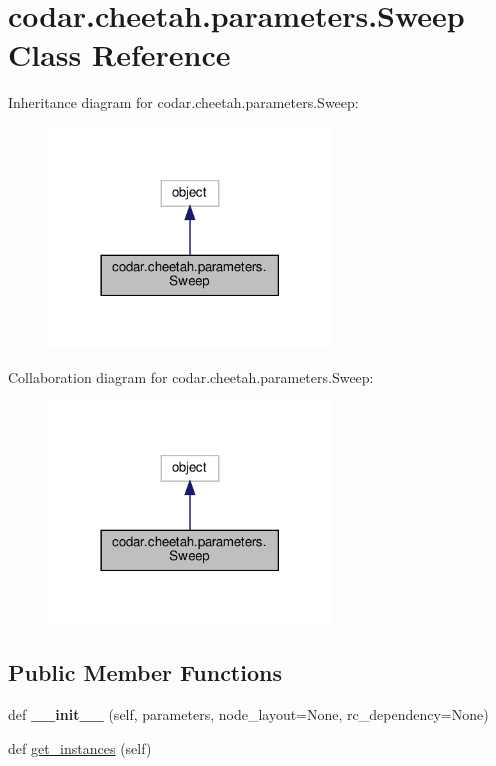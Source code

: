 \hypertarget{classcodar_1_1cheetah_1_1parameters_1_1_sweep}{}\section{codar.\+cheetah.\+parameters.\+Sweep Class Reference}
\label{classcodar_1_1cheetah_1_1parameters_1_1_sweep}


Inheritance diagram for codar.\+cheetah.\+parameters.\+Sweep\+:
\nopagebreak
\begin{figure}[H]
\begin{center}
\leavevmode
\includegraphics[width=213pt]{classcodar_1_1cheetah_1_1parameters_1_1_sweep__inherit__graph}
\end{center}
\end{figure}


Collaboration diagram for codar.\+cheetah.\+parameters.\+Sweep\+:
\nopagebreak
\begin{figure}[H]
\begin{center}
\leavevmode
\includegraphics[width=213pt]{classcodar_1_1cheetah_1_1parameters_1_1_sweep__coll__graph}
\end{center}
\end{figure}
\subsection*{Public Member Functions}
\begin{DoxyCompactItemize}
\item 
\mbox{\label{classcodar_1_1cheetah_1_1parameters_1_1_sweep_a3ea717e50ebd6bf25d6c0548060d9b44}} 
def {\bfseries \+\_\+\+\_\+init\+\_\+\+\_\+} (self, parameters, node\+\_\+layout=None, rc\+\_\+dependency=None)
\item 
def \hyperlink{classcodar_1_1cheetah_1_1parameters_1_1_sweep_a25c111a2541f852d385d84baf51e9687}{get\+\_\+instances} (self)
\end{DoxyCompactItemize}
